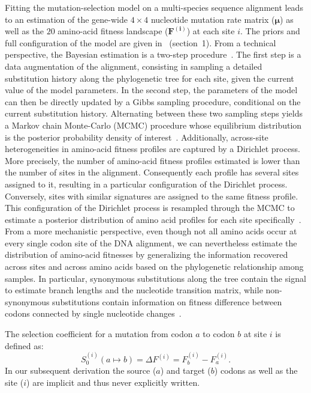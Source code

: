 \documentclass[10pt,letterpaper]{article}
\newcommand{\Sphy}{S_{0}}
\begin{document}
Fitting the mutation-selection model on a multi-species sequence alignment leads to an estimation of the gene-wide $4 \times 4$ nucleotide mutation rate matrix ($\bm{\mu}$) as well as the $20$ amino-acid fitness landscape ($\bm{F^{(i)}}$) at each site $i$.
The priors and full configuration of the model are given in~ (section~1).
From a technical perspective, the Bayesian estimation is a two-step procedure~\cite{rodrigue_bayesian_2008}.
The first step is a data augmentation of the alignment, consisting in sampling a detailed substitution history along the phylogenetic tree for each site, given the current value of the model parameters.
In the second step, the parameters of the model can then be directly updated by a Gibbs sampling procedure, conditional on the current substitution history.
Alternating between these two sampling steps yields a Markov chain Monte-Carlo (MCMC) procedure whose equilibrium distribution is the posterior probability density of interest~\cite{lartillot_bayesian_2004, rodrigue_bayesian_2008}.
Additionally, across-site heterogeneities in amino-acid fitness profiles are captured by a Dirichlet process.
More precisely, the number of amino-acid fitness profiles estimated is lower than the number of sites in the alignment.
Consequently each profile has several sites assigned to it, resulting in a particular configuration of the Dirichlet process.
Conversely, sites with similar signatures are assigned to the same fitness profile.
This configuration of the Dirichlet process is resampled through the MCMC to estimate a posterior distribution of amino acid profiles for each site specifically~\cite{rodrigue_mutationselection_2010, lartillot_inference_2013}.
From a more mechanistic perspective, even though not all amino acids occur at every single codon site of the DNA alignment, we can nevertheless estimate the distribution of amino-acid fitnesses by generalizing the information recovered across sites and across amino acids based on the phylogenetic relationship among samples.
In particular, synonymous substitutions along the tree contain the signal to estimate branch lengths and the nucleotide transition matrix, while non-synonymous substitutions contain information on fitness difference between codons connected by single nucleotide changes~\cite{rodrigue_mutationselection_2010}.

The selection coefficient for a mutation from codon $a$ to codon $b$ at site $i$ is defined as:
\begin{equation}
\Sphy^{(i)} (a \mapsto b) = \Delta F^{(i)} = F^{(i)}_{b} - F^{(i)}_{a}.
\end{equation}
In our subsequent derivation the source ($a$) and target ($b$) codons as well as the site ($i$) are implicit and thus never explicitly written.
\end{document}
